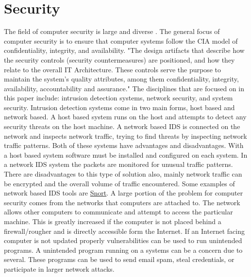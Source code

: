 \documentclass[12pt]{article}
\begin{document}
\section{Security}
The field of computer security is large and diverse \cite{ComputerSecurity}. The general focus of computer security is to ensure that computer systems follow the CIA model of confidentiality, integrity, and availability. "The design artifacts that describe how the security controls (security countermeasures) are positioned, and how they relate to the overall IT Architecture. These controls serve the purpose to maintain the system's quality attributes, among them confidentiality, integrity, availability, accountability and assurance." \cite{it_security_architecture} The disciplines that are focused on in this paper include: intrusion detection systems, network security, and system security.
Intrusion detection systems come in two main forms, host based and network based. A host based system runs on the host and attempts to detect any security threats on the host machine. A network based IDS is connected on the network and inspects network traffic, trying to find threats by inspecting network traffic patterns. Both of these systems have advantages and disadvantages. With a host based system software must be installed and configured on each system. In a network IDS system the packets are monitored for unusual traffic patterns. There are disadvantages to this type of solution also, mainly network traffic can be encrypted and the overall volume of traffic encountered. Some examples of network based IDS tools are \href{https://www.snort.org/}{Snort}.
A large portion of the problem for computer security comes from the networks that computers are attached to. The network allows other computers to communicate and attempt to access the particular machine. This is greatly increased if the computer is not placed behind a firewall/rougher and is directly accessible form the Internet. If an Internet facing computer is not updated properly vulnerabilities can be used to run unintended programs.
A unintended program running on a systems can be a concern due to several. These programs can be used to send email spam, steal credentials, or participate in larger network attacks.

\end{document}
